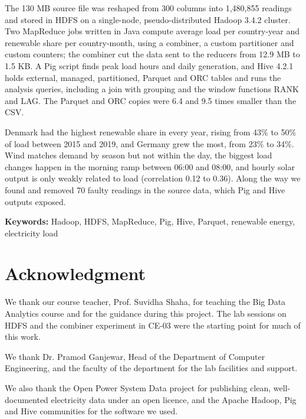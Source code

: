 \documentclass[12pt,a4paper]{report}
\newcommand{\guide}{Prof. Suvidha Shaha}
\newcommand{\hod}{Dr. Pramod Ganjewar}
\begin{document}
The 130 MB source file was reshaped from 300 columns into 1,480,855 readings and stored in HDFS on a single-node, pseudo-distributed Hadoop 3.4.2 cluster. Two MapReduce jobs written in Java compute average load per country-year and renewable share per country-month, using a combiner, a custom partitioner and custom counters; the combiner cut the data sent to the reducers from 12.9 MB to 1.5 KB. A Pig script finds peak load hours and daily generation, and Hive 4.2.1 holds external, managed, partitioned, Parquet and ORC tables and runs the analysis queries, including a join with grouping and the window functions RANK and LAG. The Parquet and ORC copies were 6.4 and 9.5 times smaller than the CSV.

Denmark had the highest renewable share in every year, rising from 43\% to 50\% of load between 2015 and 2019, and Germany grew the most, from 23\% to 34\%. Wind matches demand by season but not within the day, the biggest load changes happen in the morning ramp between 06:00 and 08:00, and hourly solar output is only weakly related to load (correlation 0.12 to 0.36). Along the way we found and removed 70 faulty readings in the source data, which Pig and Hive outputs exposed.

\textbf{Keywords:} Hadoop, HDFS, MapReduce, Pig, Hive, Parquet, renewable energy, electricity load

\chapter*{Acknowledgment}
We thank our course teacher, \guide, for teaching the Big Data Analytics course and for the guidance during this project. The lab sessions on HDFS and the combiner experiment in CE-03 were the starting point for much of this work.

We thank \hod, Head of the Department of Computer Engineering, and the faculty of the department for the lab facilities and support.

We also thank the Open Power System Data project for publishing clean, well-documented electricity data under an open licence, and the Apache Hadoop, Pig and Hive communities for the software we used.

\tableofcontents
\listoffigures
\listoftables

\clearpage
{}

\end{document}
